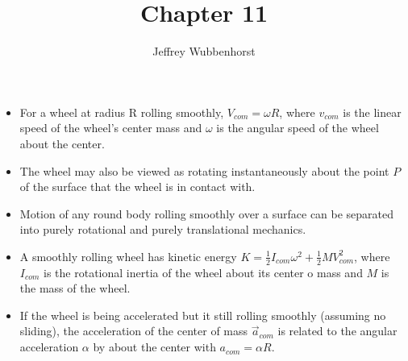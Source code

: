 \documentclass[10pt,letterpaper]{article}
\author{Jeffrey Wubbenhorst}
\title{Chapter 11}
\begin{document}
\maketitle

\begin{itemize}
\item For a wheel at radius R rolling smoothly, $V_{com}=\omega R$, where $v_{com}$ is the linear speed of the wheel's center mass and $\omega$ is the angular speed of the wheel about the center. 

\item The wheel may also be viewed as rotating instantaneously about the point $P$ of the surface that the wheel is in contact with. 

\item Motion of any round body rolling smoothly over a surface can be separated into purely rotational and purely translational mechanics. %
\item A smoothly rolling wheel has kinetic energy $K=\frac{1}{2}I_{com}\omega^2+\frac{1}{2}MV_{com}^2$, where $I_{com}$ is the rotational inertia of the wheel about its center o mass and $M$ is the mass of the wheel. 

\item If the wheel is being accelerated but it still rolling smoothly (assuming no sliding), the acceleration of the center of mass $\vec{a}_{com}$ is related to the angular acceleration $\alpha$ by about the center with $a_{com}=\alpha R$. 


\end{itemize}
\end{document}
